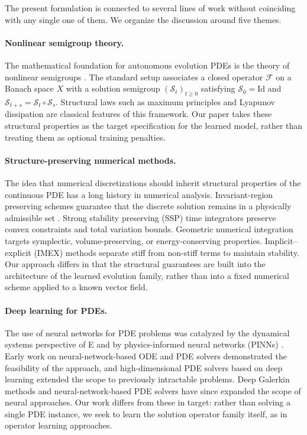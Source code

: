 \documentclass[11pt]{article}
\newcommand{\cS}{\mathcal{S}}
\newcommand{\cF}{\mathcal{F}}
\begin{document}
The present formulation is connected to several lines of work without coinciding with any single one of them. We organize the discussion around five themes.

\paragraph{Nonlinear semigroup theory.}
The mathematical foundation for autonomous evolution PDEs is the theory of nonlinear semigroups \cite{Pazy1983Semigroups,CazenaveHaraux1998Semilinear,Barbu2010NonlinearDE}. The standard setup associates a closed operator $\cF$ on a Banach space $X$ with a solution semigroup $(\cS_t)_{t\ge 0}$ satisfying $\cS_0=\mathrm{Id}$ and $\cS_{t+s}=\cS_t\circ \cS_s$. Structural laws such as maximum principles and Lyapunov dissipation are classical features of this framework. Our paper takes these structural properties as the target specification for the learned model, rather than treating them as optional training penalties.

\paragraph{Structure-preserving numerical methods.}
The idea that numerical discretizations should inherit structural properties of the continuous PDE has a long history in numerical analysis. Invariant-region preserving schemes guarantee that the discrete solution remains in a physically admissible set \cite{KarlsenRisebro2003Invariant,HundsdorferVerwer2003Numerical,ChernogorovaTemov2022InvariantRegion}. Strong stability preserving (SSP) time integrators \cite{GottliebShuTadmor2001StrongStability} preserve convex constraints and total variation bounds. Geometric numerical integration \cite{HairerLubichWanner2006Geometric,SanzSerna2016Geometric} targets symplectic, volume-preserving, or energy-conserving properties. Implicit--explicit (IMEX) methods \cite{PareschiRusso2005IMEX} separate stiff from non-stiff terms to maintain stability. Our approach differs in that the structural guarantees are built into the architecture of the learned evolution family, rather than into a fixed numerical scheme applied to a known vector field.

\paragraph{Deep learning for PDEs.}
The use of neural networks for PDE problems was catalyzed by the dynamical systems perspective of E \cite{E2017Proposal} and by physics-informed neural networks (PINNs) \cite{RaissiPerdikarisKarniadakis2019PINNs}. Early work on neural-network-based ODE and PDE solvers \cite{LarisFotiadis1998} demonstrated the feasibility of the approach, and high-dimensional PDE solvers based on deep learning \cite{HanJentzenE2018} extended the scope to previously intractable problems. Deep Galerkin methods \cite{SirignanoSpiliopoulos2018DGM} and neural-network-based PDE solvers \cite{RuthottoHaber2020DeepPDE} have since expanded the scope of neural approaches. Our work differs from these in target: rather than solving a single PDE instance, we seek to learn the solution operator family itself, as in operator learning approaches.
\end{document}

